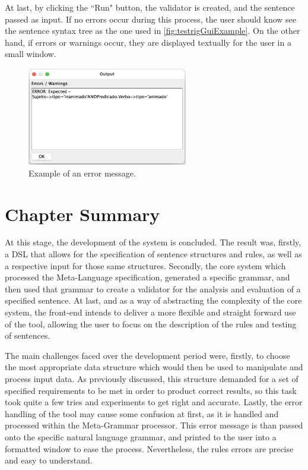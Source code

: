 \newpage
At last, by clicking the ``Run" button, the validator is created, and the sentence passed as input.
If no errors occur during this process, the user should know see the sentence syntax tree as the one used in \autoref{fig:testrigGuiExample}.
On the other hand, if errors or warnings occur, they are displayed textually for the user in a small window.

\begin{figure}[h]
    \centering
    \includegraphics[width=7cm]{images/lyntax_error_window.png}
    \caption{Example of an error message.}
    \label{fig:lyntaxErrorWindow}
\end{figure}


\section{Chapter Summary}

At this stage, the development of the system is concluded.
The result was, firstly, a DSL that allows for the specification of sentence structures and rules, as well as a respective input for those same structures.
Secondly, the core system which processed the Meta-Language specification, generated a specific grammar, 
and then used that grammar to create a validator for the analysis and evaluation of a specified sentence.
At last, and as a way of abstracting the complexity of the core system, 
the front-end intends to deliver a more flexible and straight forward use of the tool,
allowing the user to focus on the description of the rules and testing of sentences.

The main challenges faced over the development period were, firstly,
to choose the most appropriate data structure which would then be used to manipulate and process input data.
As previously discussed, this structure demanded for a set of specified requirements to be met in order to product correct results, 
so this task took quite a few tries and experiments to get right and accurate.
Lastly, the error handling of the tool may cause some confusion at first, as it is handled and processed within the Meta-Grammar processor.
This error message is than passed onto the specific natural language grammar, and printed to the user into a formatted window to ease the process.
Nevertheless, the rules errors are precise and easy to understand.

